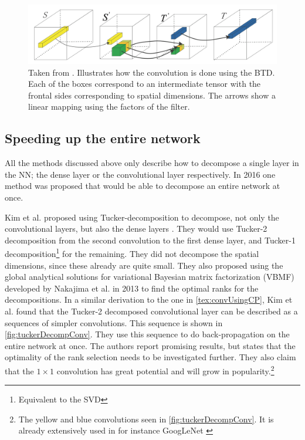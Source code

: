 \begin{figure}
    \centering
    \includegraphics[width=.8\linewidth]{Pics/03_Previous_work/BTD_conv_decomp.png}
    \captionsetup{width=.85\linewidth}
    \caption{Taken from \cite{Wang2016}. Illustrates how the convolution is done using the BTD. Each of the boxes correspond to an intermediate tensor with the frontal sides corresponding to spatial dimensions. The arrows show a linear mapping using the factors of the filter.}
    \label{fig:BTD_conv_decomp}
\end{figure}

\subsection{Speeding up the entire network}
All the methods discussed above only describe how to decompose a single layer in the NN; the dense layer or the convolutional layer respectively. In 2016 one method was proposed that would be able to decompose an entire network at once.

Kim et al. proposed using Tucker-decomposition to decompose, not only the convolutional layers, but also the dense layers \cite{Kim2016}. They would use Tucker-2 decomposition from the second convolution to the first dense layer, and Tucker-1 decomposition\footnote{Equivalent to the SVD} for the remaining. They did not decompose the spatial dimensions, since these already are quite small. They also proposed using the global analytical solutions for variational Bayesian matrix factorization (VBMF) developed by Nakajima et al. in 2013 \cite{Nakajima2013} to find the optimal ranks for the decompositions. In a similar derivation to the one in \autoref{tex:convUsingCP}, Kim et al. found that the Tucker-2 decomposed convolutional layer can be described as a sequences of simpler convolutions. This sequence is shown in \autoref{fig:tuckerDecompConv}. They use this sequence to do back-propagation on the entire network at once. The authors report promising results, but states that the optimality of the rank selection needs to be investigated further. They also claim that the $1\times 1$ convolution has great potential and will grow in popularity.\footnote{The yellow and blue convolutions seen in \autoref{fig:tuckerDecompConv}. It is already extensively used in for instance GoogLeNet \cite{Szegedy2015}}

